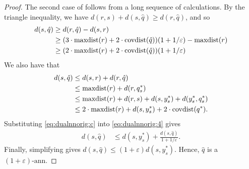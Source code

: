 \documentclass[thesis.tex]{subfiles}
\newcommand{\dist}[2]{\distf({#1},{#2})}
\newcommand{\distf}{d}
\newcommand{\eann}{(1+\varepsilon)\text{-ann}}
\newcommand{\mkfunction}[1]{\ifmmode{\textnormal{{#1}}}}
\newcommand{\covdist}[1]    {\mkfunction{covdist}({#1})}
\newcommand{\maxdist}[1]    {\mkfunction{maxdist}({#1})}
\begin{document}
{\begin{proof}
    The second case of follows from a long sequence of calculations.
    By the triangle inequality, we have
    $
        \dist {r}{s} + \dist{s}{\hat q}
        \ge \dist{r}{\hat q}
        $,
        and so
    \begin{align}
        \dist{s}{\hat q} 
        &\ge \dist{r}{\hat q} - \dist{s}{r}
        \label{eq:dualnnorig:a}
        \\&\ge (3\cdot\maxdist r+ 2\cdot\covdist{\hat q})(1+1/\varepsilon) - \maxdist{r}
        \label{eq:dualnnorig:b}
        \\&\ge (2\cdot\maxdist r+ 2\cdot\covdist{\hat q})(1+1/\varepsilon) 
        \label{eq:dualnnorig:c}
    \end{align}
    We also have that
    \begin{align}
        \dist{s}{\hat q} 
        &\le \dist{s}{r} + \dist{r}{\hat q}
        \label{eq:dualnnorig:1}
        \\&\le \maxdist{r} + \dist{r}{q^*_s}
        \label{eq:dualnnorig:2}
        \\&\le \maxdist{r} + \dist{r}{s} + \dist{s}{y^*_s} + \dist{y^*_s}{q^*_s}
        \label{eq:dualnnorig:3}
        \\&\le 2\cdot\maxdist{r} + \dist{s}{y^*_s} + 2\cdot\covdist{q^*}
        \label{eq:dualnnorig:4}
        .
    \end{align}
    Substituting \eqref{eq:dualnnorig:c} into \eqref{eq:dualnnorig:4} gives
    \begin{align}
        \dist{s}{\hat q} 
        &\le \dist{s}{y^*_s} + \frac{\dist{s}{\hat q}}{1+1/\varepsilon}
        .
    \end{align}
    Finally, simplifying gives $\dist{s}{\hat q} \le (1+\varepsilon)\dist{s}{y^*_s}$.
    Hence, $\hat q$ is a $\eann$.
\end{proof}
}

\end{document}

